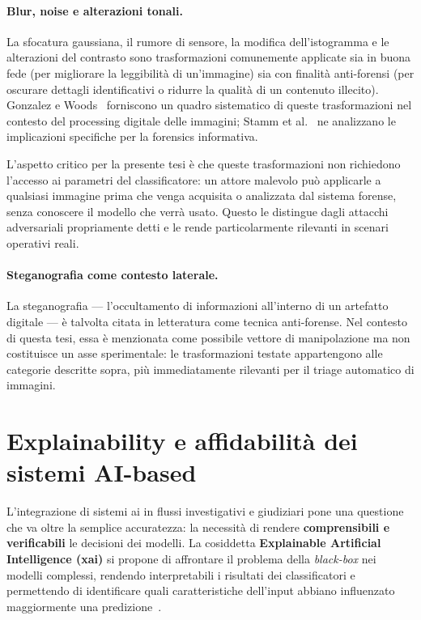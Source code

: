 \paragraph{Blur, noise e alterazioni tonali.}
La sfocatura gaussiana, il rumore di sensore, la modifica dell'istogramma e le alterazioni del contrasto sono trasformazioni comunemente applicate sia in buona fede (per migliorare la leggibilità di un'immagine) sia con finalità anti-forensi (per oscurare dettagli identificativi o ridurre la qualità di un contenuto illecito). Gonzalez e Woods~\cite{gonzalez2018digital} forniscono un quadro sistematico di queste trasformazioni nel contesto del processing digitale delle immagini; Stamm et al.~\cite{stamm2013information} ne analizzano le implicazioni specifiche per la forensics informativa.

L'aspetto critico per la presente tesi è che queste trasformazioni non richiedono l'accesso ai parametri del classificatore: un attore malevolo può applicarle a qualsiasi immagine prima che venga acquisita o analizzata dal sistema forense, senza conoscere il modello che verrà usato. Questo le distingue dagli attacchi adversariali propriamente detti e le rende particolarmente rilevanti in scenari operativi reali.

\paragraph{Steganografia come contesto laterale.}
La steganografia — l'occultamento di informazioni all'interno di un artefatto digitale — è talvolta citata in letteratura come tecnica anti-forense. Nel contesto di questa tesi, essa è menzionata come possibile vettore di manipolazione ma non costituisce un asse sperimentale: le trasformazioni testate appartengono alle categorie descritte sopra, più immediatamente rilevanti per il triage automatico di immagini.


\section{Explainability e affidabilità dei sistemi AI-based}
\label{sec:xai}

L'integrazione di sistemi \gls{ai} in flussi investigativi e giudiziari pone una questione che va oltre la semplice accuratezza: la necessità di rendere \textbf{comprensibili e verificabili} le decisioni dei modelli. La cosiddetta \textbf{Explainable Artificial Intelligence (\gls{xai})} si propone di affrontare il problema della \textit{black-box} nei modelli complessi, rendendo interpretabili i risultati dei classificatori e permettendo di identificare quali caratteristiche dell'input abbiano influenzato maggiormente una predizione~\cite{Adadi2018}.

